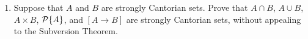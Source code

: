 \begin{enumerate}
\item  Suppose that $A$ and $B$ are strongly Cantorian sets.  Prove that $A \cap B$, $A \cup B$, $A \times B$, ${\cal
  P}\{A\}$, and $[A \rightarrow B]$ are strongly Cantorian sets, without
  appealing to the Subversion Theorem.

\end{enumerate}
